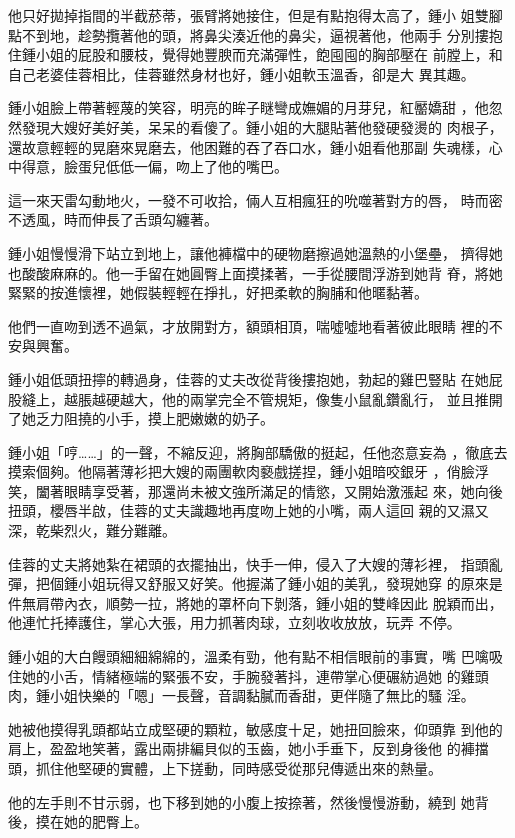 他只好拋掉指間的半截菸蒂，張臂將她接住，但是有點抱得太高了，鍾小
姐雙腳點不到地，趁勢攬著他的頭，將鼻尖湊近他的鼻尖，逼視著他，他兩手
分別摟抱住鍾小姐的屁股和腰枝，覺得她豐腴而充滿彈性，飽囤囤的胸部壓在
前膛上，和自己老婆佳蓉相比，佳蓉雖然身材也好，鍾小姐軟玉溫香，卻是大
異其趣。

鍾小姐臉上帶著輕蔑的笑容，明亮的眸子瞇彎成嫵媚的月芽兒，紅靨嬌甜
，他忽然發現大嫂好美好美，呆呆的看傻了。鍾小姐的大腿貼著他發硬發燙的
肉根子，還故意輕輕的晃磨來晃磨去，他困難的吞了吞口水，鍾小姐看他那副
失魂樣，心中得意，臉蛋兒低低一偏，吻上了他的嘴巴。

這一來天雷勾動地火，一發不可收拾，倆人互相瘋狂的吮噬著對方的唇，
時而密不透風，時而伸長了舌頭勾纏著。

鍾小姐慢慢滑下站立到地上，讓他褲檔中的硬物磨擦過她溫熱的小堡壘，
擠得她也酸酸麻麻的。他一手留在她圓臀上面摸揉著，一手從腰間浮游到她背
脊，將她緊緊的按進懷裡，她假裝輕輕在掙扎，好把柔軟的胸脯和他暱黏著。

他們一直吻到透不過氣，才放開對方，額頭相頂，喘噓噓地看著彼此眼睛
裡的不安與興奮。

鍾小姐低頭扭擰的轉過身，佳蓉的丈夫改從背後摟抱她，勃起的雞巴豎貼
在她屁股縫上，越脹越硬越大，他的兩掌完全不管規矩，像隻小鼠亂鑽亂行，
並且推開了她乏力阻撓的小手，摸上肥嫩嫩的奶子。

鍾小姐「哼……」的一聲，不縮反迎，將胸部驕傲的挺起，任他恣意妄為
，徹底去摸索個夠。他隔著薄衫把大嫂的兩團軟肉褻戲搓捏，鍾小姐暗咬銀牙
，俏臉浮笑，闔著眼睛享受著，那還尚未被文強所滿足的情慾，又開始激漲起
來，她向後扭頭，櫻唇半啟，佳蓉的丈夫識趣地再度吻上她的小嘴，兩人這回
親的又濕又深，乾柴烈火，難分難離。

佳蓉的丈夫將她紮在裙頭的衣擺抽出，快手一伸，侵入了大嫂的薄衫裡，
指頭亂彈，把個鍾小姐玩得又舒服又好笑。他握滿了鍾小姐的美乳，發現她穿
的原來是件無肩帶內衣，順勢一拉，將她的罩杯向下剝落，鍾小姐的雙峰因此
脫穎而出，他連忙托捧護住，掌心大張，用力抓著肉球，立刻收收放放，玩弄
不停。

鍾小姐的大白饅頭細細綿綿的，溫柔有勁，他有點不相信眼前的事實，嘴
巴噙吸住她的小舌，情緒極端的緊張不安，手腕發著抖，連帶掌心便碾紡過她
的雞頭肉，鍾小姐快樂的「嗯」一長聲，音調黏膩而香甜，更伴隨了無比的騷
淫。

她被他摸得乳頭都站立成堅硬的顆粒，敏感度十足，她扭回臉來，仰頭靠
到他的肩上，盈盈地笑著，露出兩排編貝似的玉齒，她小手垂下，反到身後他
的褲擋頭，抓住他堅硬的實體，上下搓動，同時感受從那兒傳遞出來的熱量。

他的左手則不甘示弱，也下移到她的小腹上按捺著，然後慢慢游動，繞到
她背後，摸在她的肥臀上。

